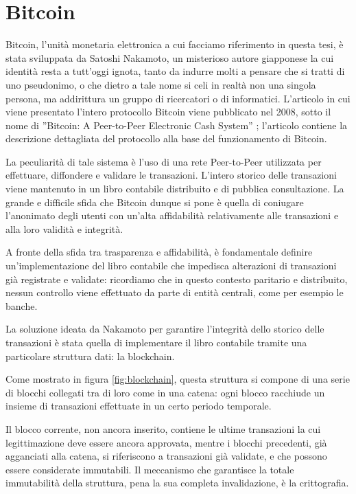 \section{Bitcoin}
Bitcoin, l’unità monetaria elettronica a cui facciamo riferimento in questa tesi, è stata sviluppata da Satoshi Nakamoto, un misterioso autore giapponese la cui identità resta a tutt'oggi ignota, tanto da indurre molti a pensare che si tratti di uno pseudonimo, o che dietro a tale nome si celi in realtà non una singola persona, ma addirittura un gruppo di ricercatori o di informatici. L’articolo in cui viene presentato l’intero protocollo Bitcoin viene pubblicato nel 2008, sotto il nome di ”Bitcoin: A Peer-to-Peer Electronic Cash System” \cite{nakamoto2009bitcoin}; l'articolo contiene la descrizione dettagliata del protocollo alla base del funzionamento di Bitcoin.

La peculiarità di tale sistema è l’uso di una rete Peer-to-Peer utilizzata per effettuare, diffondere e validare le transazioni. L’intero storico delle transazioni viene mantenuto in un libro contabile distribuito e di pubblica consultazione. La grande e difficile sfida che Bitcoin dunque si pone è quella di coniugare l’anonimato degli utenti con un’alta affidabilità relativamente alle transazioni e alla loro validità e integrità.

A fronte della sfida tra trasparenza e affidabilità, è fondamentale definire un’implementazione del libro contabile che impedisca alterazioni di transazioni già registrate e validate: ricordiamo che in questo contesto paritario e distribuito, nessun controllo viene effettuato da parte di entità centrali, come per esempio le banche.


La soluzione ideata da Nakamoto per garantire l’integrità dello storico delle transazioni è stata quella di implementare il libro contabile tramite una particolare struttura dati: la blockchain.

Come mostrato in figura \ref{fig:blockchain}, questa struttura si compone di una serie di blocchi collegati tra di loro come in una catena: ogni blocco racchiude un insieme di transazioni effettuate in un certo periodo temporale.

Il blocco corrente, non ancora inserito, contiene le ultime transazioni la cui legittimazione deve essere ancora approvata, mentre i blocchi precedenti, già agganciati alla catena, si riferiscono a transazioni già validate, e che possono essere considerate immutabili. Il meccanismo che garantisce la totale immutabilità della struttura, pena la sua completa invalidazione, è la crittografia.

